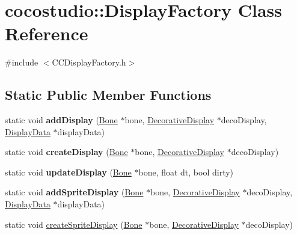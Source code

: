 \hypertarget{classcocostudio_1_1DisplayFactory}{}\section{cocostudio\+:\+:Display\+Factory Class Reference}
\label{classcocostudio_1_1DisplayFactory}


{\ttfamily \#include $<$C\+C\+Display\+Factory.\+h$>$}

\subsection*{Static Public Member Functions}
\begin{DoxyCompactItemize}
\item 
\mbox{\label{classcocostudio_1_1DisplayFactory_ac96d887f11a90d282e5e36e1b8f3a532}} 
static void {\bfseries add\+Display} (\hyperlink{classcocostudio_1_1Bone}{Bone} $\ast$bone, \hyperlink{classcocostudio_1_1DecorativeDisplay}{Decorative\+Display} $\ast$deco\+Display, \hyperlink{classcocostudio_1_1DisplayData}{Display\+Data} $\ast$display\+Data)
\item 
\mbox{\label{classcocostudio_1_1DisplayFactory_ae586f0a6567832935784131f4e9330dd}} 
static void {\bfseries create\+Display} (\hyperlink{classcocostudio_1_1Bone}{Bone} $\ast$bone, \hyperlink{classcocostudio_1_1DecorativeDisplay}{Decorative\+Display} $\ast$deco\+Display)
\item 
\mbox{\label{classcocostudio_1_1DisplayFactory_a36eb9ba9f30f518972899f3850285f73}} 
static void {\bfseries update\+Display} (\hyperlink{classcocostudio_1_1Bone}{Bone} $\ast$bone, float dt, bool dirty)
\item 
\mbox{\label{classcocostudio_1_1DisplayFactory_a5a04456773a9a346b8c0653b59643729}} 
static void {\bfseries add\+Sprite\+Display} (\hyperlink{classcocostudio_1_1Bone}{Bone} $\ast$bone, \hyperlink{classcocostudio_1_1DecorativeDisplay}{Decorative\+Display} $\ast$deco\+Display, \hyperlink{classcocostudio_1_1DisplayData}{Display\+Data} $\ast$display\+Data)
\item 
static void \hyperlink{classcocostudio_1_1DisplayFactory_af37ea092eb4a2f9d6813a01f6a70b0c9}{create\+Sprite\+Display} (\hyperlink{classcocostudio_1_1Bone}{Bone} $\ast$bone, \hyperlink{classcocostudio_1_1DecorativeDisplay}{Decorative\+Display} $\ast$deco\+Display)

\end{DoxyCompactItemize}
